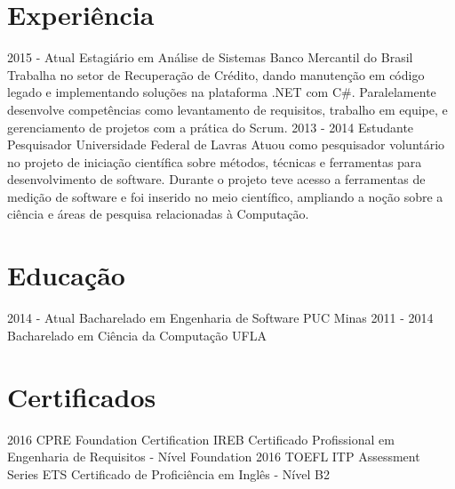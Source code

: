 \documentclass[a4paper]{cv-style}
\begin{document}
  \section{Experiência}

    \begin{entrylist}
      \vspace{5pt}
      \entry
      {2015 - Atual}
      {Estagiário em Análise de Sistemas}
      {Banco Mercantil do Brasil}
      {Trabalha no setor de Recuperação de Crédito, dando manutenção em código legado e implementando soluções na plataforma .NET com C\#. Paralelamente desenvolve competências como levantamento de requisitos, trabalho em equipe, e gerenciamento de projetos com a prática do Scrum.}
      \vspace{5pt}
      \entry
      {2013 - 2014}
      {Estudante Pesquisador}
      {Universidade Federal de Lavras}
      {Atuou como pesquisador voluntário no projeto de iniciação científica sobre métodos, técnicas e ferramentas para desenvolvimento de software. Durante o projeto teve acesso a ferramentas de medição de software e foi inserido no meio científico, ampliando a noção sobre a ciência e áreas de pesquisa relacionadas à Computação.}
    \end{entrylist}

\section{Educação}
  \begin{entrylist}
\entry
{2014 - Atual}
{{\normalfont Bacharelado em} Engenharia de Software}
{PUC Minas}
{\vspace{-0.3cm}}
\entry
{2011 - 2014}
{{\normalfont Bacharelado em} Ciência da Computação}
{UFLA}

\end{entrylist}

\section{Certificados}
\begin{entrylist}
\entry
{2016}
{CPRE Foundation Certification}
{IREB}
{Certificado Profissional em Engenharia de Requisitos - Nível Foundation}
\entry
{2016}
{TOEFL ITP Assessment Series}
{ETS}
{Certificado de Proficiência em Inglês - Nível B2}
\end{entrylist}
\end{document}
